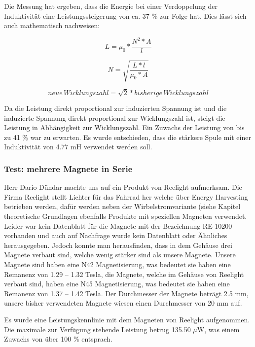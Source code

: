 Die Messung hat ergeben, dass die Energie bei einer Verdoppelung der Induktivität eine Leistungssteigerung von ca. 37 \% zur Folge hat. Dies lässt sich auch mathematisch nachweisen:

\begin{equation}
	L = \mu_0 * \frac{N^2*A}{l}
\end{equation}

\begin{equation}
	N = \sqrt{\frac{L*l}{\mu_0*A}}
\end{equation}

\begin{equation}
	neue\,Wicklungszahl = \sqrt{2} * bisherige\,Wicklungszahl
\end{equation}

Da die Leistung direkt proportional zur induzierten Spannung ist und die induzierte Spannung direkt proportional zur Wicklungszahl ist, steigt die Leistung in Abhängigkeit zur Wicklungszahl. Ein Zuwachs der Leistung von bis zu 41 \% war zu erwarten. Es wurde entschieden, dass die stärkere Spule mit einer Induktivität von 4.77 mH verwendet werden soll.

\subsubsection{Test: mehrere Magnete in Serie}

Herr Dario Dündar machte uns auf ein Produkt von Reelight aufmerksam. Die Firma Reelight stellt Lichter für das Fahrrad her welche über Energy Harvesting betrieben werden, dafür werden neben der Wirbelstromvariante (siehe Kapitel theoretische Grundlagen  ebenfalls Produkte mit speziellen Magneten verwendet. Leider war kein Datenblatt für die Magnete mit der Bezeichnung RE-10200 vorhanden und auch auf Nachfrage wurde kein Datenblatt oder Ähnliches herausgegeben. Jedoch konnte man herausfinden, dass in dem Gehäuse drei Magnete verbaut sind, welche wenig stärker sind als unsere Magnete. Unsere Magnete sind haben eine N42 Magnetisierung, was bedeutet sie haben eine Remanenz von 1.29 – 1.32 Tesla, die Magnete, welche im Gehäuse von Reelight verbaut sind, haben eine N45 Magnetisierung, was bedeutet sie haben eine Remanenz von 1.37 – 1.42 Tesla. Der Durchmesser der Magnete beträgt 2.5 mm, unsere bisher verwendeten Magnete wiesen einen Durchmesser von 20 mm auf. 

Es wurde eine Leistungskennlinie mit dem Magneten von Reelight aufgenommen. Die maximale zur Verfügung stehende Leistung betrug 135.50 $\mu$W, was einem Zuwachs von über 100 \% entsprach.

